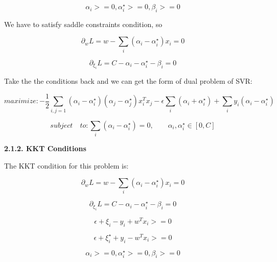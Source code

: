 \documentclass{article} %
\begin{document}
\begin{equation}
\alpha_i >= 0, \alpha_i^{\star} >= 0, \beta_i >= 0
\end{equation}

We have to satisfy saddle constraints condition, so

\begin{equation}
\partial_w L = w - \sum_i (\alpha_i - \alpha_i^{\star}) x_i = 0
\end{equation}

\begin{equation}
\partial_{\xi_i} L = C - \alpha_i -\alpha_i^{\star} - \beta_i = 0
\end{equation}

Take the the conditions back and we can get the form of dual problem of SVR:

\begin{equation}
maximize: - \frac{1}{2} \sum_{i,j=1} (\alpha_i - \alpha_i^{\star})
(\alpha_j - \alpha_j^{\star}) x_i^T x_j
- \epsilon \sum_i (\alpha_i + \alpha_i^{\star})
+ \sum_i y_i (\alpha_i - \alpha_i^{\star})
\end{equation}

\begin{equation}
subject \quad to: \sum_i (\alpha_i - \alpha_i^{\star}) = 0, \qquad
\alpha_i, \alpha_i^{\star} \in [ 0, C]
\end{equation}


\textbf{2.1.2. KKT Conditions}

The KKT condition for this problem is:

\begin{equation}
\partial_w L = w - \sum_i (\alpha_i - \alpha_i^{\star}) x_i = 0
\end{equation}

\begin{equation}
\partial_{\xi_i} L = C - \alpha_i -\alpha_i^{\star} - \beta_i = 0
\end{equation}

\begin{equation}
\epsilon + \xi_i - y_i + w^T x_i >= 0
\end{equation}

\begin{equation}
\epsilon + \xi_i^{\star} + y_i - w^T x_i >= 0
\end{equation}

\begin{equation}
\alpha_i >= 0, \alpha_i^{\star} >= 0, \beta_i >=0
\end{equation}
\end{document}
